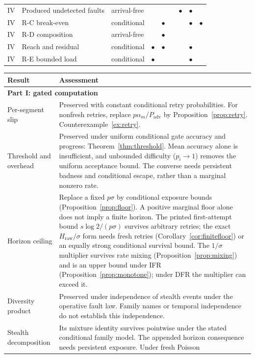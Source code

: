 \documentclass[11pt]{article}
\theoremstyle{definition}
\theoremstyle{remark}
\begin{document}
\begin{table}[!ht]
\begin{tabular}{lllcccccc}
IV & Produced undetected faults & arrival-free &  &  &  & $\bullet$ & $\bullet$ & \\
IV & R-C break-even & conditional &  & $\bullet$ &  &  & $\bullet$ & $\bullet$\\
IV & R-D composition & arrival-free &  & $\bullet$ &  &  &  & \\
IV & Reach and residual & conditional & $\bullet$ & $\bullet$ &  &  & $\bullet$ & \\
IV & R-E bounded load & conditional & $\bullet$ &  &  &  & $\bullet$ & \\
\bottomrule
\end{tabular}
\end{table}

\small
\begin{longtable}{p{}p{}}
\toprule Result & Assessment \\\midrule\endhead
\multicolumn{2}{l}{\textbf{Part I: gated computation}}\\
Per-segment slip & Preserved with constant conditional retry probabilities. For nonfresh retries,
replace $p\alpha_m/P_{\mathrm{adv}}$ by Proposition~\ref{prop:retry}. Counterexample~\ref{ex:retry}.\\
Threshold and overhead & Preserved under uniform conditional gate accuracy and progress:
Theorem~\ref{thm:threshold}. Mean accuracy alone is insufficient, and unbounded difficulty
($p_i\to1$) removes the uniform acceptance bound. The converse needs persistent badness and
conditional escape, rather than a marginal nonzero rate.\\
Horizon ceiling & Replace a fixed $p\sigma$ by conditional exposure bounds
(Proposition~\ref{prop:floor}). A positive marginal floor alone does not imply a finite horizon.
The printed first-attempt bound $s\log2/(p\sigma)$ survives arbitrary retries; the exact
$H_{\mathrm{raw}}/\sigma$ form needs fresh retries (Corollary~\ref{cor:finitefloor}) or an
equally strong conditional survival bound. The $1/\sigma$ multiplier survives rate mixing (Proposition~\ref{prop:mixing}) and is an upper
bound under IFR (Proposition~\ref{prop:monotone}); under DFR the multiplier can exceed it.\\
Diversity product & Preserved under independence of stealth events under the operative fault
law. Family names or temporal independence do not establish this independence.\\
Stealth decomposition & Its mixture identity survives pointwise under the stated conditional
family model. The appended horizon consequence needs persistent exposure. Under fresh Poisson

\end{longtable}
\end{document}
